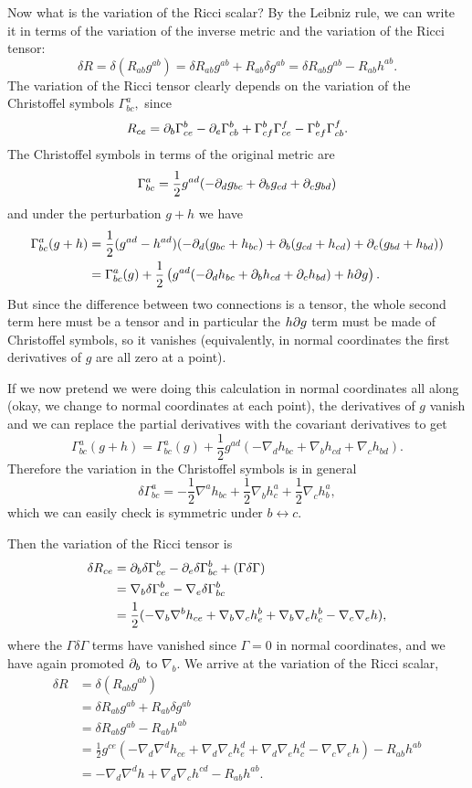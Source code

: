 Now what is the variation of the Ricci scalar? By the Leibniz rule, we can write it in terms of the variation of the inverse metric and the variation of the Ricci tensor:
$$\delta R = \delta(R_{ab} g^{ab})=\delta R_{ab} g^{ab} +R_{ab} \delta g^{ab}= \delta R_{ab} g^{ab}-R_{ab} h^{ab}.$$
The variation of the Ricci tensor clearly depends on the variation of the Christoffel symbols $\Gamma^a_{bc},$ since
$$R_{ce}=\partial_b \Gamma^b_{ce}-\partial_e \Gamma^b_{cb}+\Gamma^b_{cf} \Gamma^f_{ce}-\Gamma^b_{ef}\Gamma^f_{cb}.$$
The Christoffel symbols in terms of the original metric are
$$\Gamma^a_{bc}=\frac{1}{2}g^{ad}(-\partial_d g_{bc}+\partial_b g_{cd} +\partial_c g_{bd})$$
and under the perturbation $g+h$ we have
\begin{align*}
\Gamma^a_{bc}(g+h)&=\frac{1}{2}(g^{ad}-h^{ad})(-\partial_d (g_{bc}+h_{bc})+\partial_b (g_{cd}+h_{cd})+\partial_c(g_{bd}+h_{bd}))\\
&=\Gamma^a_{bc}(g)+\frac{1}{2}\left(g^{ad}(-\partial_d h_{bc}+\partial_b h_{cd}+\partial_c h_{bd})+h\partial g\right).
\end{align*}
But since the difference between two connections is a tensor, the whole second term here must be a tensor and in particular the $h\partial g$ term must be made of Christoffel symbols, so it vanishes (equivalently, in normal coordinates the first derivatives of $g$ are all zero at a point).%

If we now pretend we were doing this calculation in normal coordinates all along (okay, we change to normal coordinates at each point), the derivatives of $g$ vanish and we can replace the partial derivatives with the covariant derivatives to get
$$\Gamma^a_{bc}(g+h)=\Gamma^a_{bc}(g)+\frac{1}{2}g^{ad}\left(-\nabla_d h_{bc}+\nabla_b h_{cd}+\nabla_c h_{bd}\right).$$
Therefore the variation in the Christoffel symbols is in general
$$\delta \Gamma^a_{bc}=-\frac{1}{2} \nabla^a h_{bc} +\frac{1}{2} \nabla_b h^a_c +\frac{1}{2}\nabla_c h^a_b,$$
which we can easily check is symmetric under $b\leftrightarrow c$.

Then the variation of the Ricci tensor is
\begin{align*}
\delta R_{ce}&= \partial_b \delta \Gamma^b_{ce} -\partial_e \delta \Gamma^b_{bc} +(\Gamma \delta \Gamma)\\
&= \nabla_b \delta \Gamma^b_{ce} -\nabla_e \delta \Gamma^b_{bc}\\
&= \frac{1}{2} (-\nabla_b \nabla^b h_{ce} +\nabla_b \nabla_c h^b_e + \nabla_b \nabla_e h^b_c - \nabla_c \nabla_e h),
\end{align*}
where the $\Gamma \delta \Gamma$ terms have vanished since $\Gamma=0$ in normal coordinates, and we have again promoted $\partial_b$ to $\nabla_b$.
We arrive at the variation of the Ricci scalar,
\begin{align*}
\delta R &= \delta (R_{ab} g^{ab})\\
&= \delta R_{ab} g^{ab} + R_{ab} \delta g^{ab}\\
&= \delta R_{ab} g^{ab} -R_{ab} h^{ab}\\
&= \frac{1}{2}g^{ce} (-\nabla_d \nabla^d h_{ce} +\nabla_d \nabla_c h^d_e + \nabla_d \nabla_e h^d_c -\nabla_c \nabla_e h)-R_{ab} h^{ab}\\
&= -\nabla_d \nabla^d h + \nabla_d \nabla_c h^{cd}-R_{ab} h^{ab}.
\end{align*}

